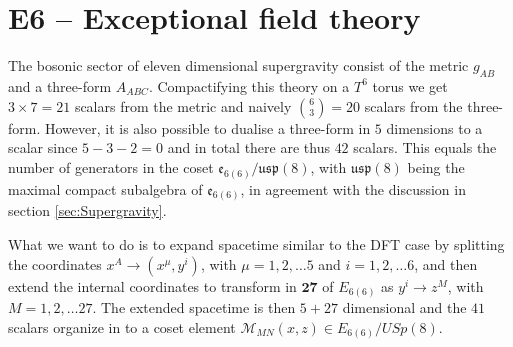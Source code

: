 \section{E6 -- Exceptional field theory \label{sec:E6}}
The bosonic sector of eleven dimensional supergravity consist of the metric $g_{AB}$ and a three-form $A_{ABC}$. Compactifying this theory on a $T^6$ torus we get $3\times 7=21$ scalars from the metric and naively ${{6}\choose{3}}=20$ scalars from the three-form. However, it is also possible to dualise a three-form in $5$ dimensions to a scalar since $5-3-2=0$ and in total there are thus $42$ scalars. This equals the number of generators in the coset $\mathfrak{e}_{6(6)}/\mathfrak{usp}(8)$, with $\mathfrak{usp}(8)$ being the maximal compact subalgebra of $\mathfrak{e}_{6(6)}$, in agreement with the discussion in section \ref{sec:Supergravity}. 

What we want to do is to expand spacetime similar to the DFT case by splitting the coordinates $x^A\to (x^\mu,y^i)$, with $\mu=1,2,\ldots 5$ and $i = 1,2,\ldots 6$, and then extend the internal coordinates to transform in $\mathbf{27}$ of $E_{6(6)}$ as $y^i\to z^M$, with $M=1,2,\ldots 27$. The extended spacetime is then $5+27$ dimensional and the $41$ scalars organize in to a coset element $\mathcal{M}_{MN}(x,z)\in E_{6(6)}/USp(8)$. 

